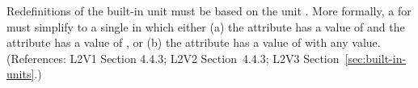 Redefinitions of the built-in unit  must be based on
the unit
.  More formally, a \UnitDefinition for  must
simplify to a single \Unit in which either (a) the 
attribute has a value of  and the 
attribute has a value of , or (b) the 
attribute has a value of  with any
 value.  (References: L2V1 Section 4.4.3; L2V2
Section~4.4.3; L2V3 Section~\ref{sec:built-in-units}.)
